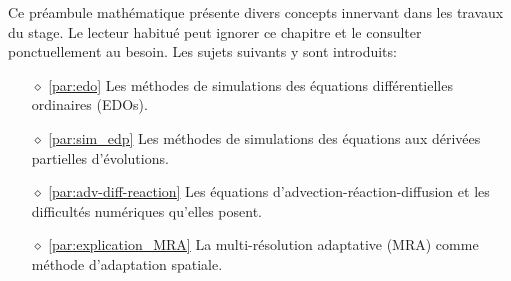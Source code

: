 Ce préambule mathématique présente divers concepts innervant dans les travaux du stage. Le lecteur habitué peut ignorer ce chapitre et 
le consulter ponctuellement au besoin. Les sujets suivants y sont introduits:
\begin{itemize}
    \item[$\diamond$] \ref{par:edo} Les méthodes de simulations des équations différentielles ordinaires (EDOs).
    \item[$\diamond$] \ref{par:sim_edp} Les méthodes de simulations des équations aux dérivées partielles d'évolutions.
    \item[$\diamond$] \ref{par:adv-diff-reaction} Les équations d'advection-réaction-diffusion et les difficultés numériques qu'elles posent.
    \item[$\diamond$] \ref{par:explication_MRA} La multi-résolution adaptative (MRA) comme méthode d'adaptation spatiale.
\end{itemize}